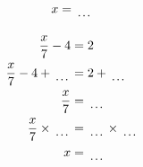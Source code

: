 \documentclass[12pt]{article}
\newcounter{minipagecount}
\begin{document}
\begin{multicols}{2}
\begin{minipage}[t]{0.45\textwidth}
\begin{align*}
        x &= \dotuline{\hspace{5mm}}\\
    \end{align*}
\end{minipage} %
\noindent{(\theminipagecount)}\hspace{0.1mm} %
\begin{minipage}[t]{0.45\textwidth} %
    \vspace{-26pt}  %
    \raggedright %
    \begin{align*} %
        \frac{x}{7} - 4 &= 2\\
        \frac{x}{7} - 4 + \dotuline{\hspace{5mm}} &= 2 + \dotuline{\hspace{5mm}}\\
        \frac{x}{7} &= \dotuline{\hspace{5mm}}\\
        \frac{x}{7} \times\dotuline{\hspace{5mm}} &= \dotuline{\hspace{5mm}} \times\dotuline{\hspace{5mm}}\\
        x &= \dotuline{\hspace{5mm}}\\
    \end{align*}
\end{minipage} %
\noindent{(\theminipagecount)}\hspace{0.1mm} %
\begin{minipage}[t]{0.45\textwidth} %
    \vspace{-26pt}  %

\end{minipage}
\end{multicols}
\end{document}
